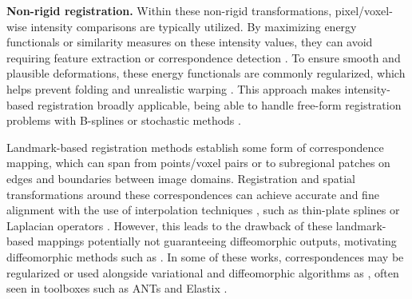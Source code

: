 \documentclass[lettersize,journal]{IEEEtran}
\begin{document}
\textbf{Non-rigid registration.}
Within these non-rigid transformations, pixel/voxel-wise intensity comparisons are typically utilized. By maximizing energy functionals or similarity measures on these intensity values, they can avoid requiring feature extraction or correspondence detection \cite{regreviewsong}. To ensure smooth and plausible deformations, these energy functionals are commonly regularized, which helps prevent folding and unrealistic warping \cite{Reithmeir2024}. This approach makes intensity-based registration broadly applicable, being able to handle free-form registration problems with B-splines \cite{Rueckert1999} or stochastic methods \cite{Tustison2009}.

Landmark-based registration methods \cite{MAINTZ19981, ZITOVA2003977} establish some form of correspondence mapping, which can span from points/voxel pairs or to subregional patches \cite{Ourselin2000BlockMA,PatchBasedRegistration} on edges and boundaries between image domains. Registration and spatial transformations around these correspondences can achieve accurate and fine alignment with the use of interpolation techniques \cite{ALLASIA20141}, such as thin-plate splines \cite{Sun2011} or Laplacian operators \cite{AgarwalRobustRegistration, AgarwalXG16, AGARWAL201845, RegBoost2025}. However, this leads to the drawback of these landmark-based mappings potentially not guaranteeing diffeomorphic outputs, motivating diffeomorphic methods such as \cite{Beg2005,THIRION1998243,VERCAUTEREN2009S61,sphericaldemons}. In some of these works, correspondences may be regularized \cite{Shusharina2012-ez} or used alongside variational and diffeomorphic algorithms as \cite{ASHBURNER200795, AVANTS200826, VERCAUTEREN2009S61}, often seen in toolboxes such as ANTs \cite{AVANTS200826} and Elastix \cite{Klein2010elastixAT}. 


\end{document}
